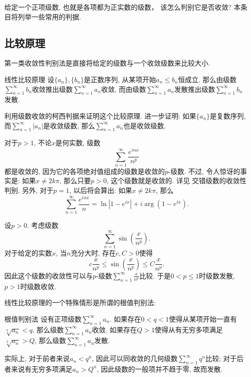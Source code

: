 

给定一个正项级数, 也就是各项都为正实数的级数， 该怎么判别它是否收敛? 本条目将列举一些常用的判据.

\subsection{比较原理}

第一类收敛性判别法是直接将给定的级数与一个收敛级数来比较大小. 

\begin{theorem}{线性比较原理}
设$\{a_n\},\{b_n\}$是正数序列, 从某项开始$a_n\leq b_n$恒成立. 那么由级数$\sum_{n=1}^\infty b_n$收敛推出级数$\sum_{n=1}^\infty a_n$收敛, 而由级数$\sum_{n=1}^\infty a_n$发散推出级数$\sum_{n=1}^\infty b_n$发散.
\end{theorem}
\begin{exercise}{}
利用级数收敛的柯西判据来证明这个比较原理. 进一步证明: 如果$\{a_n\}$是复数序列, 而$\sum_{n=1}^\infty|a_n|$是收敛级数, 那么$\sum_{n=1}^\infty a_n$也是收敛级数.
\end{exercise}

\begin{example}{}
对于$p>1$, 不论$x$是何实数, 级数
$$
\sum_{n=1}^\infty\frac{e^{inx}}{n^p}
$$
都是收敛的, 因为它的各项绝对值组成的级数是收敛的$p$-级数. 不过, 令人惊讶的事实是: 如果$x\neq 2k\pi$, 那么只要$p>0$, 这个级数就是收敛的. 详见 交错级数的收敛性判别. 另外, 对于$p=1$, 以后将会算出: 如果$x\neq 2k\pi$, 那么
$$
\sum_{n=1}^\infty\frac{e^{inx}}{n}=\ln|1-e^{ix}|+i\arg(1-e^{ix}).
$$
\end{example}

\begin{example}{}
设$p>0$. 考虑级数
$$
\sum_{n=1}^\infty\sin\left(\frac{x}{n^p}\right).
$$
对于给定的实数$x$, 当$n$充分大时, 存在$c,C>0$使得
$$
c\frac{x}{n^p}\leq\sin\left(\frac{x}{n^p}\right)\leq C\frac{x}{n^p}.
$$
因此这个级数的收敛性可以与$p$-级数$\sum_{n=1}^\infty\frac{x}{n^p}$比较. 于是$0<p\leq1$时级数发散, $p>1$时级数收敛.
\end{example}

线性比较原理的一个特殊情形是所谓的根值判别法:

\begin{theorem}{根值判别法}
设有正项级数$\sum_{n=1}^\infty a_n$. 如果存在$0<q<1$使得从某项开始一直有$\sqrt[n]{a_n}<q$, 那么级数$\sum_{n=1}^\infty a_n$收敛. 如果存在$Q>1$使得从有无穷多项满足$\sqrt[n]{a_n}>Q$, 那么级数$\sum_{n=1}^\infty a_n$发散.
\end{theorem}
实际上, 对于前者来说$a_n<q^n$, 因此可以同收敛的几何级数$\sum_{n=1}^\infty q^n$比较; 对于后者来说有无穷多项满足$a_n>Q^n$, 因此级数的一般项并不趋于零, 故而发散.

